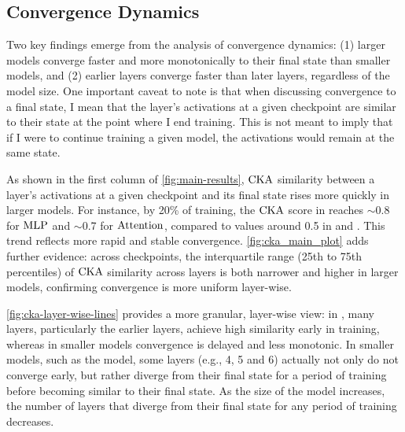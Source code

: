 \subsection{Convergence Dynamics}
\label{subsec:convergence-dynamics}

Two key findings emerge from the analysis of convergence dynamics: (1) larger models converge faster and more monotonically to their final state than smaller models, and (2) earlier layers converge faster than later layers, regardless of the model size. One important caveat to note is that when discussing convergence to a final state, I mean that the layer's activations at a given checkpoint are similar to their state at the point where I end training. This is not meant to imply that if I were to continue training a given model, the activations would remain at the same state. 

\begin{result} 
\label{result:cka}
    
As shown in the first column of \cref{fig:main-results}, $\mathrm{CKA}$ similarity between a layer's activations at a given checkpoint and its final state rises more quickly in larger models. For instance, by 20\% of training, the $\mathrm{CKA}$ score in \twobil reaches $\sim$0.8 for $\mathrm{MLP}$ and $\sim$0.7 for $\mathrm{Attention}$, compared to values around 0.5 in \sevenmil and \sixmil. This trend reflects more rapid and stable convergence. \cref{fig:cka_main_plot} adds further evidence: across checkpoints, the interquartile range (25th to 75th percentiles) of $\mathrm{CKA}$ similarity across layers is both narrower and higher in larger models, confirming convergence is more uniform layer-wise.

\cref{fig:cka-layer-wise-lines} provides a more granular, layer-wise view: in \twobil, many layers, particularly the earlier layers, achieve high similarity early in training, whereas in smaller models convergence is delayed and less monotonic. In smaller models, such as the \sevenmil model, some layers (e.g., 4, 5 and 6) actually not only do not converge early, but rather diverge from their final state for a period of training before becoming similar to their final state. As the size of the model increases, the number of layers that diverge from their final state for any period of training decreases.

\end{result}

